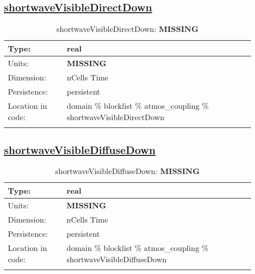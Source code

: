 \subsection[shortwaveVisibleDirectDown]{\hyperref[sec:var_tab_atmos_coupling]{shortwaveVisibleDirectDown}}
\label{subsec:var_sec_atmos_coupling_shortwaveVisibleDirectDown}
\begin{center}
\begin{longtable}{| p{2.0in} | p{4.0in} |}
        \hline 
        Type: & real \\
        \hline 
        Units: & {\bf \color{red} MISSING} \\
        \hline 
        Dimension: & nCells Time \\
        \hline 
        Persistence: & persistent \\
        \hline 
         Location in code: & domain \% blocklist \% atmos\_coupling \% shortwaveVisibleDirectDown \\
         \hline 
    \caption{shortwaveVisibleDirectDown: {\bf \color{red} MISSING}}
\end{longtable}
\end{center}
\subsection[shortwaveVisibleDiffuseDown]{\hyperref[sec:var_tab_atmos_coupling]{shortwaveVisibleDiffuseDown}}
\label{subsec:var_sec_atmos_coupling_shortwaveVisibleDiffuseDown}
\begin{center}
\begin{longtable}{| p{2.0in} | p{4.0in} |}
        \hline 
        Type: & real \\
        \hline 
        Units: & {\bf \color{red} MISSING} \\
        \hline 
        Dimension: & nCells Time \\
        \hline 
        Persistence: & persistent \\
        \hline 
         Location in code: & domain \% blocklist \% atmos\_coupling \% shortwaveVisibleDiffuseDown \\
         \hline 
    \caption{shortwaveVisibleDiffuseDown: {\bf \color{red} MISSING}}
\end{longtable}
\end{center}
